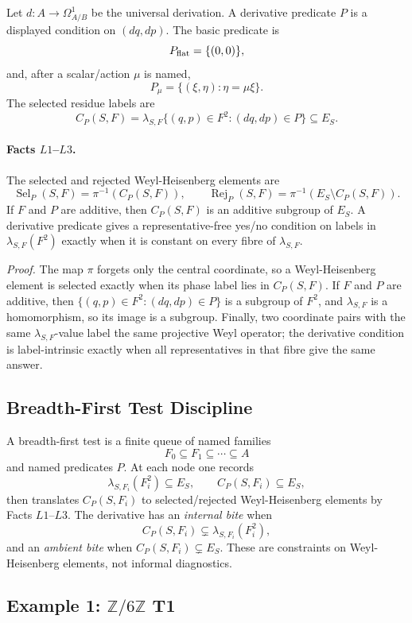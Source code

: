 Let \(d:A\to\Omega^1_{A/B}\) be the universal derivation.  A derivative
predicate \(P\) is a displayed condition on \((dq,dp)\).  The basic predicate is
\[
  P_{\rm flat}=\{(0,0)\},
\]
and, after a scalar/action \(\mu\) is named,
\[
  P_\mu=\{(\xi,\eta):\eta=\mu\xi\}.
\]
The selected residue labels are
\[
  C_P(S,F)=
  \lambda_{S,F}\{(q,p)\in F^2:(dq,dp)\in P\}\subseteq E_S .
\]

\paragraph{Facts \(L1\)--\(L3\).}
The selected and rejected Weyl-Heisenberg elements are
\[
  \operatorname{Sel}_P(S,F)=\pi^{-1}(C_P(S,F)),\qquad
  \operatorname{Rej}_P(S,F)=\pi^{-1}(E_S\setminus C_P(S,F)).
\]
If \(F\) and \(P\) are additive, then \(C_P(S,F)\) is an additive subgroup of
\(E_S\).  A derivative predicate gives a representative-free yes/no condition
on labels in \(\lambda_{S,F}(F^2)\) exactly when it is constant on every fibre
of \(\lambda_{S,F}\).

\emph{Proof.}
The map \(\pi\) forgets only the central coordinate, so a Weyl-Heisenberg
element is selected exactly when its phase label lies in \(C_P(S,F)\).  If
\(F\) and \(P\) are additive, then
\(\{(q,p)\in F^2:(dq,dp)\in P\}\) is a subgroup of \(F^2\), and
\(\lambda_{S,F}\) is a homomorphism, so its image is a subgroup.  Finally, two
coordinate pairs with the same \(\lambda_{S,F}\)-value label the same
projective Weyl operator; the derivative condition is label-intrinsic exactly
when all representatives in that fibre give the same answer.

\subsection{Breadth-First Test Discipline}

A breadth-first test is a finite queue of named families
\[
  F_0\subseteq F_1\subseteq\cdots\subseteq A
\]
and named predicates \(P\).  At each node one records
\[
  \lambda_{S,F_i}(F_i^2)\subseteq E_S,\qquad C_P(S,F_i)\subseteq E_S,
\]
then translates \(C_P(S,F_i)\) to selected/rejected Weyl-Heisenberg elements by
Facts \(L1\)--\(L3\).  The derivative has an \emph{internal bite} when
\[
  C_P(S,F_i)\subsetneq\lambda_{S,F_i}(F_i^2),
\]
and an \emph{ambient bite} when \(C_P(S,F_i)\subsetneq E_S\).  These are
constraints on Weyl-Heisenberg elements, not informal diagnostics.

\subsection{Example 1: \texorpdfstring{\(\mathbb Z/6\mathbb Z\)}{Z/6Z} T1}

